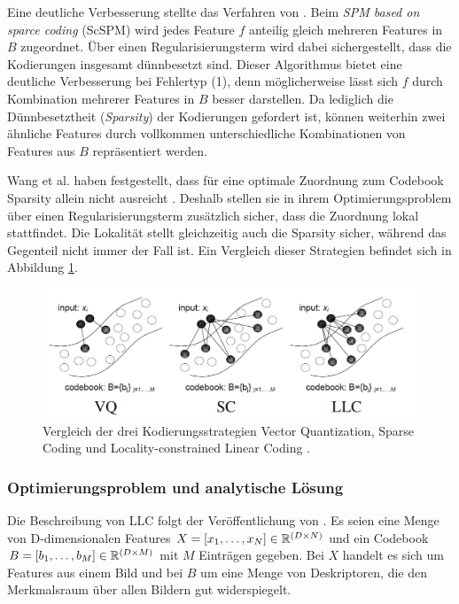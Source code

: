 Eine deutliche Verbesserung stellte das Verfahren von \cite{yygh09}. Beim \emph{SPM based on sparce coding} (ScSPM) wird jedes Feature $f$ anteilig gleich mehreren Features in $B$ zugeordnet. Über einen Regularisierungsterm wird dabei sichergestellt, dass die Kodierungen insgesamt dünnbesetzt sind. Dieser Algorithmus bietet eine deutliche Verbesserung bei Fehlertyp (1), denn möglicherweise lässt sich $f$ durch Kombination mehrerer Features in $B$ besser darstellen. Da lediglich die Dünnbesetztheit (\emph{Sparsity}) der Kodierungen gefordert ist, können weiterhin zwei ähnliche Features durch vollkommen unterschiedliche Kombinationen von Features aus $B$ repräsentiert werden.

Wang et al. haben festgestellt, dass für eine optimale Zuordnung zum Codebook Sparsity allein nicht ausreicht \cite{wyylhg10}. Deshalb stellen sie in ihrem Optimierungsproblem über einen Regularisierungsterm zusätzlich sicher, dass die Zuordnung lokal stattfindet. Die Lokalität stellt gleichzeitig auch die Sparsity sicher, während das Gegenteil nicht immer der Fall ist. Ein Vergleich dieser Strategien befindet sich in Abbildung \ref{img:quant_comp}.

\begin{figure}
	\centering
	\includegraphics[scale=0.5]{img/quant_comp.png}
	\caption{Vergleich der drei Kodierungsstrategien Vector Quantization, Sparse Coding und Locality-constrained Linear Coding \cite{wyylhg10}.}
	\label{img:quant_comp}
\end{figure}

\subsubsection{Optimierungsproblem und analytische Lösung}
\label{sec:llc}

Die Beschreibung von LLC folgt der Veröffentlichung von \cite{wyylhg10}. Es seien eine Menge von D-dimensionalen Features $X = [x_1, \dots, x_N] \in \mathbb{R}^{(D \times N)}$ und ein Codebook $B = [b_1, \dots, b_M] \in \mathbb{R}^{(D \times M)}$ mit $M$ Einträgen gegeben. Bei $X$ handelt es sich um Features aus einem Bild und bei $B$ um eine Menge von Deskriptoren, die den Merkmalsraum über allen Bildern gut widerspiegelt.
 
